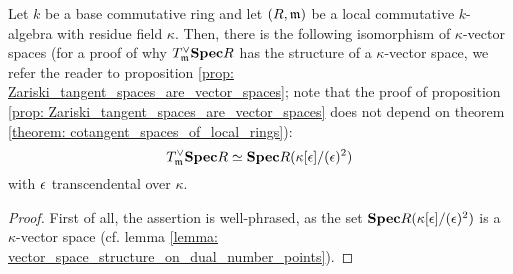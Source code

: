             \begin{theorem} \label{theorem: cotangent_spaces_of_local_rings}  
                Let $k$ be a base commutative ring and let $(R, \mathfrak{m})$ be a local commutative $k$-algebra with residue field $\kappa$. Then, there is the following isomorphism of $\kappa$-vector spaces (for a proof of why $T^{\vee}_{\mathfrak{m}}\mathbf{Spec} R$ has the structure of a $\kappa$-vector space, we refer the reader to proposition \ref{prop: Zariski_tangent_spaces_are_vector_spaces}; note that the proof of proposition \ref{prop: Zariski_tangent_spaces_are_vector_spaces} does not depend on theorem \ref{theorem: cotangent_spaces_of_local_rings}):
                    $$T^{\vee}_{\mathfrak{m}}\mathbf{Spec} R \simeq \mathbf{Spec} R(\kappa[\epsilon]/(\epsilon)^2)$$
                with $\epsilon$ transcendental over $\kappa$.
            \end{theorem}
                \begin{proof}
                    First of all, the assertion is well-phrased, as the set $\mathbf{Spec} R(\kappa[\epsilon]/(\epsilon)^2)$ is a $\kappa$-vector space (cf. lemma \ref{lemma: vector_space_structure_on_dual_number_points}). 
                \end{proof}
